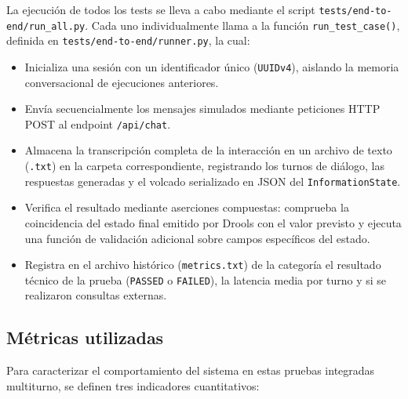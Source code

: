 \documentclass[12pt,a4paper]{report}
\begin{document}
La ejecución de todos los tests se lleva a cabo mediante el script \texttt{tests/end-to-end/run\_all.py}. Cada uno individualmente llama a la función \texttt{run\_test\_case()}, definida en \texttt{tests/end-to-end/runner.py}, la cual:
\begin{itemize}
    \item Inicializa una sesión con un identificador único (\texttt{UUIDv4}), aislando la memoria conversacional de ejecuciones anteriores.
    \item Envía secuencialmente los mensajes simulados mediante peticiones HTTP POST al endpoint \texttt{/api/chat}.
    \item Almacena la transcripción completa de la interacción en un archivo de texto (\texttt{.txt}) en la carpeta correspondiente, registrando los turnos de diálogo, las respuestas generadas y el volcado serializado en JSON del \texttt{InformationState}.
    \item Verifica el resultado mediante aserciones compuestas: comprueba la coincidencia del estado final emitido por Drools con el valor previsto y ejecuta una función de validación adicional sobre campos específicos del estado.
    \item Registra en el archivo histórico (\texttt{metrics.txt}) de la categoría el resultado técnico de la prueba (\texttt{PASSED} o \texttt{FAILED}), la latencia media por turno y si se realizaron consultas externas.
\end{itemize}

\subsection{Métricas utilizadas}

Para caracterizar el comportamiento del sistema en estas pruebas integradas multiturno, se definen tres indicadores cuantitativos:
\end{document}
